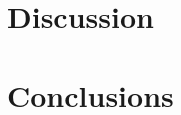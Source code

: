 \documentclass[a4paper,10pt,oneside,twocolumn,notitlepage,final]{jarticle}
\begin{document}
\section{Discussion}
\label{s:discussion}


\section{Conclusions}

\small
\begin{thebibliography}{99}
\end{thebibliography}
\end{document}
